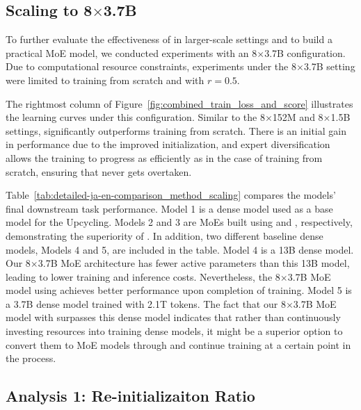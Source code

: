 \subsection{Scaling to \texorpdfstring{8$\times$3.7}{8x3.7}B}

\label{sec:resuilts-scaling}
To further evaluate the effectiveness of \methodname{} in larger-scale settings and to build a practical MoE model, we conducted experiments with an 8$\times$3.7B configuration. Due to computational resource constraints, experiments under the 8$\times$3.7B setting were limited to training from scratch and \methodname{} with \( r = 0.5 \).

The rightmost column of Figure~\ref{fig:combined_train_loss_and_score} illustrates the learning curves under this configuration. Similar to the 8$\times$152M and 8$\times$1.5B settings, \methodname{} significantly outperforms training from scratch. There is an initial gain in performance due to the improved initialization, and expert diversification allows the training to progress as efficiently as in the case of training from scratch, ensuring that \methodname{} never gets overtaken.


Table~\ref{tab:detailed-ja-en-comparison_method_scaling} compares the models' final downstream task performance. 
Model 1 is a dense model used as a base model for the Upcycling.
Models 2 and 3 are MoEs built using \NUname{} and \methodname{}, respectively, demonstrating the superiority of \methodname{}.
In addition, two different baseline dense models, Models 4 and 5, are included in the table. Model 4 is a 13B dense model. Our 8$\times$3.7B MoE architecture has fewer active parameters than this 13B model, leading to lower training and inference costs. Nevertheless, the 8$\times$3.7B MoE model using \methodname{} achieves better performance upon completion of training. Model 5 is a 3.7B dense model trained with 2.1T tokens. The fact that our 8$\times$3.7B MoE model with \methodname{} surpasses this dense model indicates that rather than continuously investing resources into training dense models, it might be a superior option to convert them to MoE models through \methodname{} and continue training at a certain point in the process.


\subsection{Analysis 1: Re-initializaiton Ratio}
\label{sec:exp:ratio}

